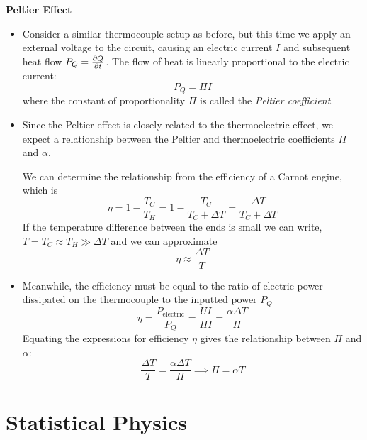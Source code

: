 \documentclass[11pt, a4paper]{article}
\begin{document}
\textbf{Peltier Effect}
\begin{itemize}
	\item Consider a similar thermocouple setup as before, but this time we apply an external voltage to the circuit, causing an electric current $ I $ and subsequent heat flow $ P_{Q} = \pdv{Q}{t} $. The flow of heat is linearly proportional to the electric current:
	\begin{equation*}
		P_{Q} = \Pi I
	\end{equation*}
	where the constant of proportionality $ \Pi $ is called the \textit{Peltier coefficient}. 
	
	\item Since the Peltier effect is closely related to the thermoelectric effect, we expect a relationship between the Peltier and thermoelectric coefficients $ \Pi $ and $ \alpha $.
	
	We can determine the relationship from the efficiency of a Carnot engine, which is
	\begin{equation*}
		\eta = 1 - \frac{T_{C}}{T_{H}} = 1 - \frac{T_{C}}{T_{C} + \Delta T} = \frac{\Delta T}{T_{C} + \Delta T} 
	\end{equation*}
	If the temperature difference between the ends is small we can write, $ T = T_{C} \approx T_{H} \gg \Delta T $ and we can approximate
	\begin{equation*}
		\eta \approx \frac{\Delta T}{T}
	\end{equation*}
	
	\item Meanwhile, the efficiency must be equal to the ratio of electric power dissipated on the thermocouple to the inputted power $ P_{Q} $
	\begin{equation*}
		\eta = \frac{P_{\text{electric}}}{P_{Q}} = \frac{U I}{\Pi I} = \frac{\alpha \Delta T}{\Pi}
	\end{equation*}
	Equating the expressions for efficiency $ \eta $ gives the relationship between $ \Pi $ and $ \alpha $:
	\begin{equation*}
		\frac{\Delta T}{T} = \frac{\alpha \Delta T}{\Pi} \implies \Pi = \alpha T
	\end{equation*}
	
	
\end{itemize}

\newpage

\section{Statistical Physics}
\end{document}
